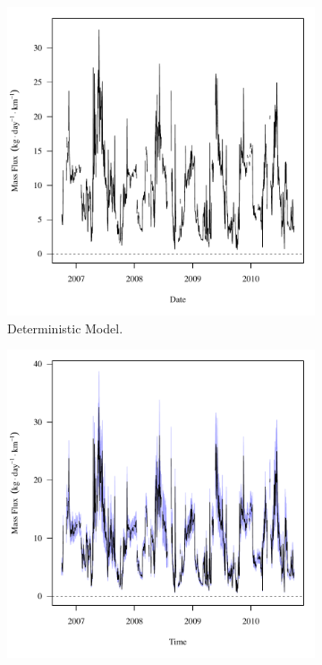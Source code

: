 \begin{linenumbers}
\begin{figure}[htbp]
\centering
	\begin{subfigure}{0.5\textwidth}
		\includegraphics[width=0.9\linewidth]{"Figures/Results_DUSR/f U163"}
		\caption{Deterministic Model.}
		\label{sub:ExampleDSeFlux}
	\end{subfigure}%
	\begin{subfigure}{0.5\textwidth}
		\includegraphics[width=0.9\linewidth]{"Figures/Results_USR/f U163"}

\end{subfigure}
\end{figure}
\end{linenumbers}
